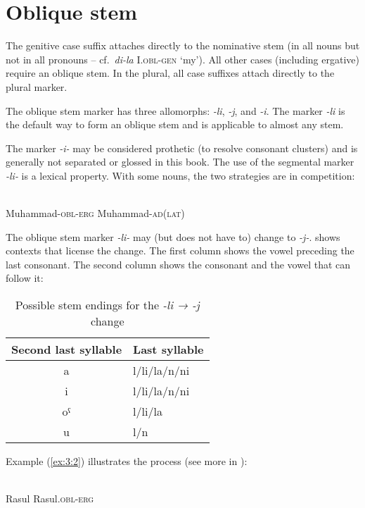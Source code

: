 ﻿\documentclass[output=paper]{langsci/langscibook}
\begin{document}
\pagebreak

\section{Oblique stem}\label{oblique-stem}

The genitive case suffix attaches directly to the nominative stem (in
all nouns but not in all pronouns – cf.\ \emph{di-la} I.\textsc{obl}-\textsc{gen}
`my'). All other cases (including ergative) require an oblique stem. In
the plural, all case suffixes attach directly to the plural marker.

The oblique stem marker has three allomorphs: \emph{-li}, \emph{-j}, and
\emph{-i}. The marker \emph{-li} is the default way to form an oblique
stem and is applicable to almost any stem.

The marker \emph{-i-} may be considered prothetic (to resolve consonant
clusters) and is generally not separated or glossed in this book. The
use of the segmental marker \emph{-li-} is a lexical property. With some
nouns, the two strategies are in competition:

\ea
{}\\
Muhammad-\textsc{obl}-\textsc{erg} Muhammad-\textsc{ad(lat)}\\
\z

The oblique stem marker \emph{-li-} may (but does not have to) change to \emph{-j-}. 
 shows contexts that license the change. The first column shows the vowel
preceding the last consonant. The second column shows the consonant and
the vowel that can follow it:

\begin{table}[h]
  \caption{Possible stem endings for the \emph{-li → -j} change} \label{tab:3:34}
\begin{tabular}{@{}cl@{}}
\toprule
{Second last syllable} & {Last syllable}\tabularnewline \midrule
a & l/li/la/n/ni\tabularnewline
i & l/li/la/n/ni\tabularnewline
oˤ & l/li/la\tabularnewline
u & l/n\tabularnewline
\bottomrule
\end{tabular}
\end{table}

Example (\ref{ex:3:2}) illustrates the process (see more in \citealt{moroz2019}):

\ea \label{ex:3:2}
\\
Rasul Rasul.\textsc{obl}-\textsc{erg}\\
\z
\end{document}
